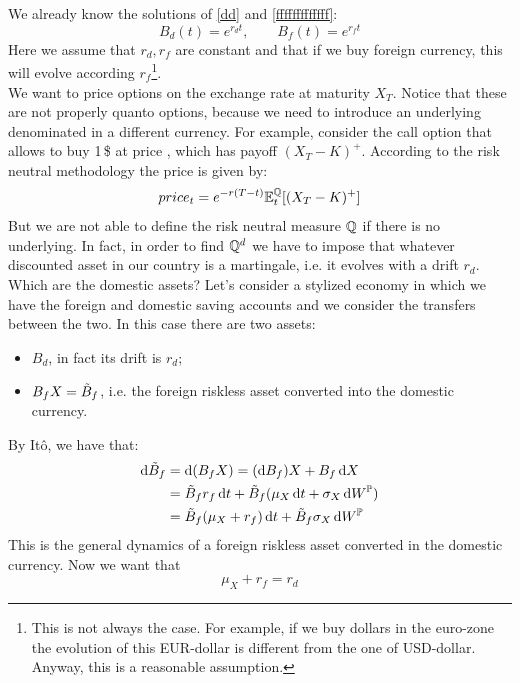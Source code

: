 We already know the solutions of \eqref{dd} and \eqref{fffffffffffff}:
\begin{equation}
    B_d(t) = e^{r_d t}, \qquad B_f(t) = e^{r_f t}
\end{equation}
Here we assume that $r_d, r_f$ are constant and that if we buy foreign currency, this will evolve according $r_f$\footnote{This is not always the case. For example, if we buy dollars in the euro-zone the evolution of this EUR-dollar is different from the one of USD-dollar. Anyway, this is a reasonable assumption.}. \\
We want to price options on the exchange rate at maturity $X_T$. Notice that these are not properly quanto options, because we need to introduce an underlying denominated in a different currency. For example, consider the call option that allows to buy 1\,\$ at price , which has payoff $(X_T-K)^+$. According to the risk neutral methodology the price is given by:
\begin{align*}
    price_t = e^{-r(T-t)}\mathbb{E}^{\mathbb{Q}}_t[(X_T-K)^+]
\end{align*}
But we are not able to define the risk neutral measure $\mathbb{Q}$ if there is no underlying. In fact, in order to find $\mathbb{Q}^d$ we have to impose that whatever discounted asset in our country is a martingale, i.e. it evolves with a drift $r_d$. \\
Which are the domestic assets? Let's consider a stylized economy in which we have the foreign and domestic saving accounts and we consider the transfers between the two. In this case there are two assets:
\begin{itemize}
    \item $B_d$, in fact its drift is $r_d$;
    \item $B_fX = \Tilde{B}_f$, i.e. the foreign riskless asset converted into the domestic currency.
\end{itemize}
By Itô, we have that:
\begin{align}\label{al1}
    \notag\dd\Tilde{B}_f &= \dd(B_fX) = (\dd B_f)X + B_f\,\dd X \\
    &=
    \notag\Tilde{B}_f r_f\, \dd t + \Tilde{B}_f(\mu_X\,\dd t + \sigma_X\,\dd W^{\mathbb{P}}) \\
    &=
    \Tilde{B}_f(\mu_X + r_f)\,\dd t + \Tilde{B}_f\sigma_X\,\dd W^{\mathbb{P}}
\end{align}
This is the general dynamics of a foreign riskless asset converted in the domestic currency. Now we want that
\begin{equation*}
    \mu_X + r_f = r_d
\end{equation*}
